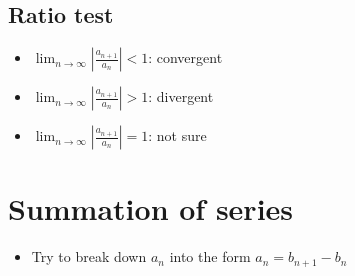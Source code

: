 \subsection{Ratio test}
\begin{itemize}
    \item $\lim_{n\rightarrow\infty} \left|\frac{a_{n+1}}{a_n}\right| < 1$: convergent
    \item $\lim_{n\rightarrow\infty} \left|\frac{a_{n+1}}{a_n}\right| > 1$: divergent
    \item $\lim_{n\rightarrow\infty} \left|\frac{a_{n+1}}{a_n}\right| = 1$: not sure
\end{itemize}

\section{Summation of series}
\begin{itemize}
    \item Try to break down $a_n$ into the form $a_n=b_{n+1}-b_n$
\end{itemize}
